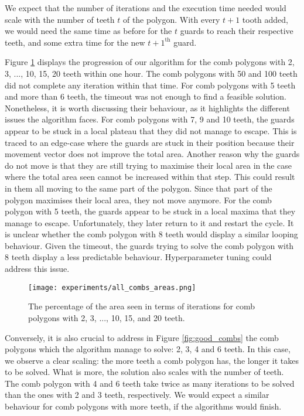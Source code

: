 We expect that the number of iterations and the execution time needed would scale with the number of teeth $t$ of the polygon. With every $t + 1$ tooth added, we would need the same time as before for the $t$ guards to reach their respective teeth, and some extra time for the new $t + 1^{\text{th}}$ guard. 

Figure \ref{fig:all_combs} displays the progression of our algorithm for the comb polygons with 2, 3, ..., 10, 15, 20 teeth within one hour. The comb polygons with 50 and 100 teeth did not complete any iteration within that time.
For comb polygons with 5 teeth and more than 6 teeth, the timeout was not enough to find a feasible solution. Nonetheless, it is worth discussing their behaviour, as it highlights the different issues the algorithm faces. 
For comb polygons with 7, 9 and 10 teeth, the guards appear to be stuck in a local plateau that they did not manage to escape. This is traced to an edge-case where the guards are stuck in their position because their movement vector does not improve the total area. Another reason why the guards do not move is that they are still trying to maximise their local area in the case where the total area seen cannot be increased within that step. This could result in them all moving to the same part of the polygon. Since that part of the polygon maximises their local area, they  not move anymore.
For the comb polygon with 5 teeth, the guards appear to be stuck in a local maxima that they manage to escape. Unfortunately, they later return to it and restart the cycle. It is unclear whether the comb polygon with 8 teeth would display a similar looping behaviour. Given the timeout, the guards trying to solve the comb polygon with 8 teeth display a less predictable behaviour. Hyperparameter tuning could address this issue.

\begin{figure}[h!]
    \centering
    \texttt{[image: experiments/all\_combs\_areas.png]}
    \caption{The percentage of the area seen in terms of iterations for comb polygons with 2, 3, ..., 10, 15, and 20 teeth.}
    \label{fig:all_combs}
\end{figure}

Conversely, it is also crucial to address in Figure \ref{fig:good_combs} the comb polygons which the algorithm manage to solve: 2, 3, 4 and 6 teeth. In this case, we  observe a clear scaling: the more teeth a comb polygon has, the longer it takes to be solved. What is more, the solution also scales with the number of teeth. The comb polygon with 4 and 6 teeth take twice as many iterations to be solved than the ones with 2 and 3 teeth, respectively. We would expect a similar behaviour for comb polygons with more teeth, if the algorithms would finish.


